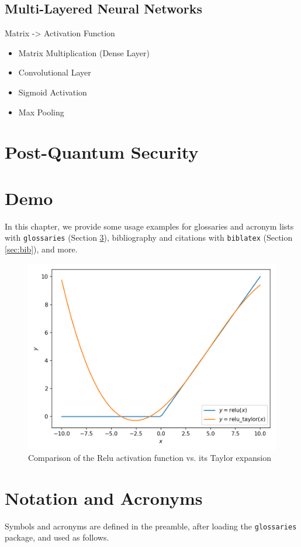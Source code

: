 \subsection{Multi-Layered Neural Networks}
Matrix -> Activation Function
\begin{itemize}
    \item Matrix Multiplication (Dense Layer)
    \item Convolutional Layer
    \item Sigmoid Activation
    \item Max Pooling
\end{itemize}

\section{Post-Quantum Security}

\section{Demo}
In this chapter, we provide some usage examples for
glossaries and acronym lists with \texttt{glossaries} (Section \ref{sec:gloss}),
bibliography and citations with \texttt{biblatex} (Section \ref{sec:bib}), and more.

\begin{figure}[H]
    \centering
    \includegraphics[width=0.8\linewidth]{figures/taylor-relu.png}
    \caption{Comparison of the Relu activation function vs. its Taylor expansion}
\end{figure}

\section{Notation and Acronyms}
\label{sec:gloss}
Symbols and acronyms are defined in the preamble, after loading the \texttt{glossaries} package, and used as follows.

